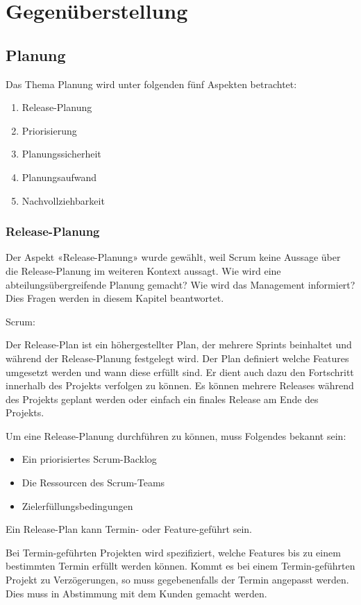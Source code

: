 \chapter{Gegenüberstellung}
\thispagestyle{fancy}
\section{Planung}

Das Thema Planung wird unter folgenden fünf Aspekten betrachtet:
\begin{enumerate}
\item Release-Planung
\item Priorisierung
\item Planungssicherheit
\item Planungsaufwand
\item Nachvollziehbarkeit
\end{enumerate}

\subsection{Release-Planung}

Der Aspekt «Release-Planung» wurde gewählt, weil Scrum keine Aussage über die Release-Planung im weiteren Kontext aussagt. Wie wird eine abteilungsübergreifende Planung gemacht? Wie wird das Management informiert? Dies Fragen werden in diesem Kapitel beantwortet.

{\Large Scrum:} \cite{planningReleaseScrum} \medskip

Der Release-Plan ist ein höhergestellter Plan, der mehrere Sprints beinhaltet und während der Release-Planung festgelegt wird. Der Plan definiert welche Features umgesetzt werden und wann diese erfüllt sind. Er dient auch dazu den Fortschritt innerhalb des Projekts verfolgen zu können. Es können mehrere Releases während des Projekts geplant werden oder einfach ein finales Release am Ende des Projekts. \medskip

Um eine Release-Planung durchführen zu können, muss Folgendes bekannt sein:
\begin{itemize}
\item Ein priorisiertes Scrum-Backlog
\item Die Ressourcen des Scrum-Teams
\item Zielerfüllungsbedingungen
\end{itemize}
Ein Release-Plan kann Termin- oder Feature-geführt sein.\smallskip

Bei Termin-geführten Projekten wird spezifiziert, welche Features bis zu einem bestimmten Termin erfüllt werden können.\smallskip
Kommt es bei einem Termin-geführten Projekt zu Verzögerungen, so muss gegebenenfalls der Termin angepasst werden. Dies muss in Abstimmung mit dem Kunden gemacht werden.

